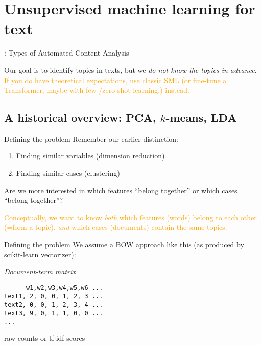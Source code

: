 \section[Unsupervised ML]{Unsupervised machine learning for text}





\begin{frame}{\cite{Boumans2016}: Types of Automated Content Analysis}
\end{frame}



\begin{frame}[standout]
Our goal is to identify topics in texts, but we \emph{do not know the topics in advance}.\\ \textcolor{orange}{If you do have theoretical expectations, use classic SML (or fine-tune a Transformer, maybe with few-/zero-shot learning.) instead.}

\end{frame}




\subsection{A historical overview: PCA, $k$-means, LDA}


\begin{frame}{Defining the problem}
Remember our earlier distinction:
\begin{enumerate}
\item Finding similar variables (dimension reduction)
\item Finding similar cases (clustering)
\end{enumerate}

\pause

Are we more interested in which features ``belong together'' or which cases ``belong together''? 

\pause

\textcolor{orange}{Conceptually, we want to know \emph{both} which features (words) belong to each other (=form a topic),  \emph{and} which cases (documents) contain the same topics.}

\end{frame}

\begin{frame}[fragile]{Defining the problem}
We assume a BOW approach like this (as produced by scikit-learn vectorizer):
    
\emph{Document-term matrix}
\begin{lstlisting}
      w1,w2,w3,w4,w5,w6 ...
text1, 2, 0, 0, 1, 2, 3 ...
text2, 0, 0, 1, 2, 3, 4 ...
text3, 9, 0, 1, 1, 0, 0 ...
...
\end{lstlisting}
    {\small{raw counts or tf$\cdot$idf scores}}

 \end{frame}
  

